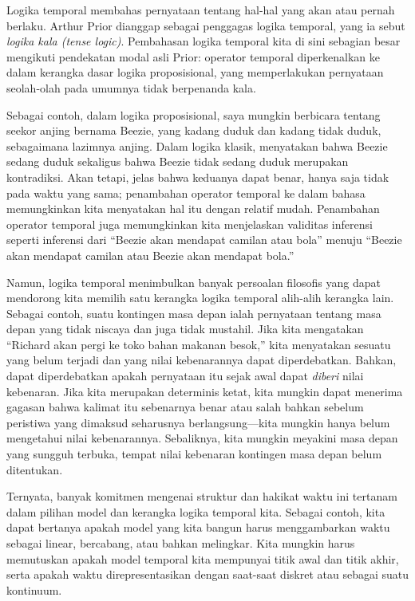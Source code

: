 \documentclass[../../../include/open-logic-section]{subfiles}
\begin{document}


Logika temporal membahas pernyataan tentang hal-hal yang akan atau pernah
berlaku. Arthur Prior dianggap sebagai penggagas logika temporal, yang ia
sebut \emph{logika kala (tense logic)}. Pembahasan logika temporal
kita di sini sebagian besar mengikuti pendekatan modal asli Prior: operator
temporal diperkenalkan ke dalam kerangka dasar logika proposisional, yang
memperlakukan pernyataan seolah-olah pada umumnya tidak berpenanda kala.

Sebagai contoh, dalam logika proposisional, saya mungkin berbicara tentang
seekor anjing bernama Beezie, yang kadang duduk dan kadang tidak duduk,
sebagaimana lazimnya anjing. Dalam logika klasik, menyatakan bahwa Beezie
sedang duduk sekaligus bahwa Beezie tidak sedang duduk merupakan
kontradiksi. Akan tetapi, jelas bahwa keduanya dapat benar, hanya saja tidak
pada waktu yang sama; penambahan operator temporal ke dalam bahasa
memungkinkan kita menyatakan hal itu dengan relatif mudah. Penambahan
operator temporal juga memungkinkan kita menjelaskan validitas inferensi
seperti inferensi dari ``Beezie akan mendapat camilan atau bola'' menuju
``Beezie akan mendapat camilan atau Beezie akan mendapat bola.''

Namun, logika temporal menimbulkan banyak persoalan filosofis yang dapat
mendorong kita memilih satu kerangka logika temporal alih-alih kerangka
lain. Sebagai contoh, suatu kontingen masa depan ialah pernyataan
tentang masa depan yang tidak niscaya dan juga tidak mustahil. Jika kita
mengatakan ``Richard akan pergi ke toko bahan makanan besok,'' kita
menyatakan sesuatu yang belum terjadi dan yang nilai kebenarannya dapat
diperdebatkan. Bahkan, dapat diperdebatkan apakah pernyataan itu sejak awal
dapat \emph{diberi} nilai kebenaran. Jika kita merupakan determinis ketat,
kita mungkin dapat menerima gagasan bahwa kalimat itu sebenarnya benar atau
salah bahkan sebelum peristiwa yang dimaksud seharusnya berlangsung---kita
mungkin hanya belum mengetahui nilai kebenarannya. Sebaliknya, kita mungkin
meyakini masa depan yang sungguh terbuka, tempat nilai kebenaran kontingen
masa depan belum ditentukan.

Ternyata, banyak komitmen mengenai struktur dan hakikat waktu ini tertanam
dalam pilihan model dan kerangka logika temporal kita. Sebagai contoh, kita
dapat bertanya apakah model yang kita bangun harus menggambarkan waktu
sebagai linear, bercabang, atau bahkan melingkar. Kita mungkin harus
memutuskan apakah model temporal kita mempunyai titik awal dan titik akhir,
serta apakah waktu direpresentasikan dengan saat-saat diskret atau sebagai
suatu kontinuum.
\end{document}
